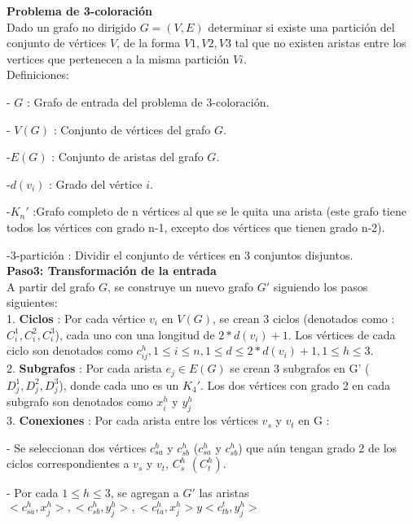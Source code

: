 \documentclass[
10pt, %
a4paper, %
oneside, %
headinclude,footinclude, %
BCOR5mm, %
]{scrartcl}
\begin{document}
\textbf{ Problema de 3-coloración} \\


Dado un grafo no dirigido $G = (V,E)$ determinar si existe una partición del conjunto de vértices $V$,
de la forma ${V1,V2,V3}$ tal que no existen aristas entre los vertices que pertenecen a la misma partición $Vi$.\\


Definiciones:

- $G$ : Grafo de entrada del problema de 3-coloración.

- $V(G)$ : Conjunto de vértices del grafo $G$.

-$E(G)$ : Conjunto de aristas del grafo $G$. 

-$d(v_i)$ : Grado del vértice $i$.

-$K_n'$ :Grafo completo de n vértices al que se le quita una arista (este grafo tiene todos los vértices con grado n-1, excepto dos vértices que tienen grado n-2).

-3-partición : Dividir el conjunto de vértices en 3 conjuntos disjuntos.\\



\textbf{Paso3: Transformación de la entrada  }\\

A partir del grafo $G$, se construye un nuevo grafo $G'$ siguiendo los pasos siguientes:\\

1. \textbf{Ciclos} : Por cada vértice $v_i$ en $V(G)$, se crean 3 ciclos (denotados como : $C^1_i, C^2_i, C^3_i$), 
cada uno con una longitud de $2*d(v_i) + 1$. Los vértices de cada ciclo son denotados como $c_{ij}^{h} , 1 \leq i \leq n , 1 \leq d \leq 2*d(v_i) + 1 , 1 \leq h \leq 3 $.\\

2. \textbf{Subgrafos} : Por cada arista $e_j \in E(G)$ se crean 3 subgrafos en G' ($D^1_j, D^2_j, D^3_j$), donde cada uno es un $K_4'$. Los dos vértices con grado 2 en cada 
subgrafo son denotados como $x^h_i$ y $y^h_j$\\

3. \textbf{Conexiones} : Por cada arista entre los vértices $v_s$ y $v_t$ en G :

- Se seleccionan dos vértices $c_{sa}^{h}$ y $c_{sb}^{h}$ ($c_{sa}^{h}$ y $c_{sb}^{h}$) que aún tengan grado 2 de los ciclos correspondientes a $v_s$ y $v_t$, $C^h_s$ $(C^h_t)$.

- Por cada $1\leq h \leq 3$, se agregan a $G'$ las aristas $<c_{sa}^{h},x^h_j> , <c_{sb}^{h},y^h_j> , <c_{ta}^{h},x^h_j>  y <c_{tb}^{t}, y^h_j >$\\
\end{document}
